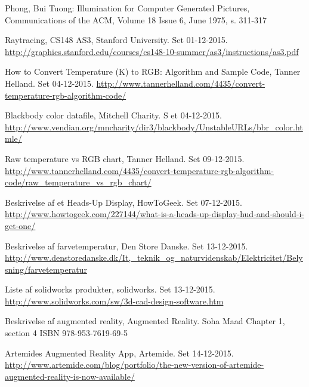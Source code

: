 \begin{thebibliography}{99}
  Phong, Bui Tuong: Illumination for Computer Generated Pictures,  Communications of the ACM, Volume 18 Issue 6, June 1975, s. 311-317

  Raytracing, 
  CS148 AS3, Stanford University. 
  Set 01-12-2015.
  \url{http://graphics.stanford.edu/courses/cs148-10-summer/as3/instructions/as3.pdf}

  How to Convert Temperature (K) to RGB: Algorithm and   Sample Code,
  Tanner Helland.
  Set 04-12-2015.
  \url{http://www.tannerhelland.com/4435/convert-temperature-rgb-algorithm-code/}
  
  Blackbody color datafile, 
  Mitchell Charity. S
  et 04-12-2015.
  \url{http://www.vendian.org/mncharity/dir3/blackbody/UnstableURLs/bbr_color.htmle/}
  
  Raw temperature vs RGB chart,
  Tanner Helland. 
  Set 09-12-2015.
  \url{http://www.tannerhelland.com/4435/convert-temperature-rgb-algorithm-code/raw_temperature_vs_rgb_chart/}
  
  Beskrivelse af et Heads-Up Display, 
  HowToGeek. 
  Set 07-12-2015.
  \url{http://www.howtogeek.com/227144/what-is-a-heads-up-display-hud-and-should-i-get-one/}

  Beskrivelse af farvetemperatur, 
  Den Store Danske. 
  Set 13-12-2015.
  \url{http://www.denstoredanske.dk/It,_teknik_og_naturvidenskab/Elektricitet/Belysning/farvetemperatur}
  
  Liste af solidworks produkter, 
  solidworks. 
  Set 13-12-2015.
  \url{http://www.solidworks.com/sw/3d-cad-design-software.htm}

  Beskrivelse af augmented reality,
  Augmented Reality.
  Soha Maad
  Chapter 1, section 4
  ISBN 978-953-7619-69-5

  Artemides Augmented Reality App, 
  Artemide.
  Set 14-12-2015.
  \url{http://www.artemide.com/blog/portfolio/the-new-version-of-artemide-augmented-reality-is-now-available/}




% 


\end{thebibliography}

